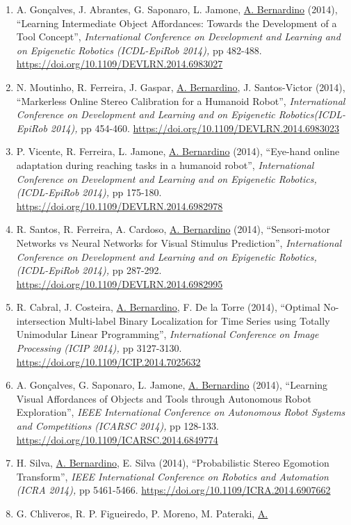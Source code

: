 \documentclass[
]{article}
\begin{document}
\begin{enumerate}
\item
  A. Gonçalves, J. Abrantes, G. Saponaro, L. Jamone, \ul{A. Bernardino}
  (2014), ``Learning Intermediate Object Affordances: Towards the
  Development of a Tool Concept'', \emph{International Conference on
  Development and Learning and on Epigenetic Robotics (ICDL-EpiRob
  2014),} pp 482-488. \url{https://doi.org/10.1109/DEVLRN.2014.6983027}~
\item
  N. Moutinho, R. Ferreira, J. Gaspar, \ul{A. Bernardino}, J.
  Santos-Victor (2014), ``Markerless Online Stereo Calibration for a
  Humanoid Robot'', \emph{International Conference on Development and
  Learning and on Epigenetic Robotics(ICDL-EpiRob 2014),} pp 454-460.
  \url{https://doi.org/10.1109/DEVLRN.2014.6983023}~
\item
  P. Vicente, R. Ferreira, L. Jamone, \ul{A. Bernardino} (2014),
  ``Eye-hand online adaptation during reaching tasks in a humanoid
  robot'', \emph{International Conference on Development and Learning
  and on Epigenetic Robotics, (ICDL-EpiRob 2014),} pp 175-180.
  \url{https://doi.org/10.1109/DEVLRN.2014.6982978}~
\item
  R. Santos, R. Ferreira, A. Cardoso, \ul{A. Bernardino} (2014),
  ``Sensori-motor Networks vs Neural Networks for Visual Stimulus
  Prediction'', \emph{International Conference on Development and
  Learning and on Epigenetic Robotics, (ICDL-EpiRob 2014),} pp 287-292.
  \url{https://doi.org/10.1109/DEVLRN.2014.6982995}~
\item
  R. Cabral, J. Costeira, \ul{A. Bernardino}, F. De la Torre (2014),
  ``Optimal No-intersection Multi-label Binary Localization for Time
  Series using Totally Unimodular Linear Programming'',
  \emph{International Conference on Image Processing (ICIP 2014),} pp
  3127-3130. \url{https://doi.org/10.1109/ICIP.2014.7025632}~
\item
  A. Gonçalves, G. Saponaro, L. Jamone, \ul{A. Bernardino} (2014),
  ``Learning Visual Affordances of Objects and Tools through Autonomous
  Robot Exploration'', \emph{IEEE International Conference on Autonomous
  Robot Systems and Competitions (ICARSC 2014),} pp 128-133.
  \url{https://doi.org/10.1109/ICARSC.2014.6849774}~
\item
  H. Silva, \ul{A. Bernardino}, E. Silva (2014), ``Probabilistic Stereo
  Egomotion Transform'', \emph{IEEE International Conference on Robotics
  and Automation (ICRA 2014),} pp 5461-5466.
  \url{https://doi.org/10.1109/ICRA.2014.6907662}~
\item
  G. Chliveros, R. P. Figueiredo, P. Moreno, M. Pateraki, \ul{A.
}
\end{enumerate}
\end{document}
